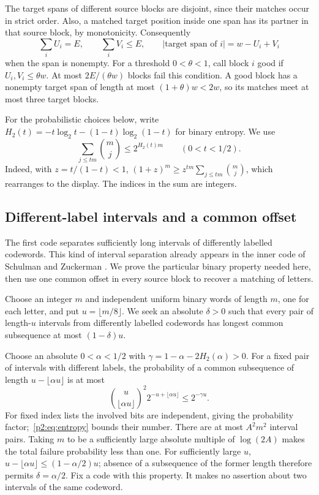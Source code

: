 The target spans of different source blocks are disjoint, since their
matches occur in strict order. Also, a matched target position inside one
span has its partner in that source block, by monotonicity. Consequently
\begin{equation}\label{p2:eq:code-loss-sums}
 \sum_iU_i=E,\qquad \sum_iV_i\leq E,
 \qquad |\text{target span of }i|=w-U_i+V_i
\end{equation}
when the span is nonempty. For a threshold $0<\theta<1$, call block $i$
good if $U_i,V_i\leq\theta w$. At most $2E/(\theta w)$ blocks fail this
condition. A good block has a nonempty target span of length at most
$(1+\theta)w<2w$, so its matches meet at most three target blocks.

For the probabilistic choices below, write
$H_2(t)=-t\log_2t-(1-t)\log_2(1-t)$ for binary entropy. We use
\begin{equation}\label{p2:eq:entropy}
 \sum_{j\leq t m}\binom mj\leq2^{H_2(t)m}\qquad(0<t<1/2).
\end{equation}
Indeed, with $z=t/(1-t)<1$,
$(1+z)^m\geq z^{tm}\sum_{j\leq tm}\binom mj$, which rearranges to the
display. The indices in the sum are integers.

\subsection{Different-label intervals and a common offset}
\label{p2:sec:code-offset}
The first code separates sufficiently long intervals of differently
labelled codewords. This kind of interval separation already appears in
the inner code of Schulman and Zuckerman
\cite[Section~II-C, Condition~2 and Lemma~2]{SchulmanZuckerman1999}.
We prove the particular binary property needed here, then use one common
offset in every source block to recover a matching of letters.

Choose an integer $m$ and independent uniform binary words of length $m$, one for each
letter, and put $u=\lfloor m/8\rfloor$. We seek an absolute $\delta>0$
such that every pair of length-$u$ intervals from differently labelled
codewords has longest common subsequence at most $(1-\delta)u$.

Choose an absolute $0<\alpha<1/2$ with
$\gamma=1-\alpha-2H_2(\alpha)>0$. For a fixed pair of intervals with
different labels, the probability of a common subsequence of length
$u-\lfloor\alpha u\rfloor$ is at most
\[
 \binom{u}{\lfloor\alpha u\rfloor}^{\!2}
       2^{-u+\lfloor\alpha u\rfloor}\leq2^{-\gamma u}.
\]
For fixed index lists the involved bits are independent, giving the
probability factor;~\eqref{p2:eq:entropy} bounds their number. There are
at most $A^2m^2$ interval pairs. Taking $m$ to be a sufficiently large
absolute multiple of $\log(2A)$ makes the total failure probability less
than one. For sufficiently large $u$,
$u-\lfloor\alpha u\rfloor\leq(1-\alpha/2)u$; absence of a subsequence of
the former length therefore permits $\delta=\alpha/2$. Fix a code with this property. It makes no assertion
about two intervals of the same codeword.

